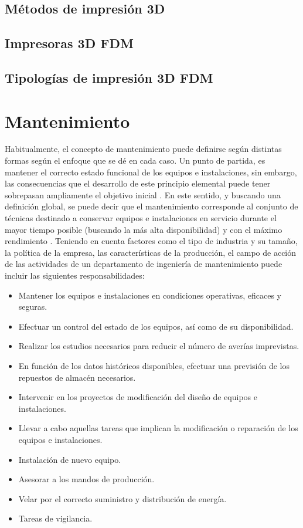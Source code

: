\subsection{Métodos de impresión 3D}

\subsection{Impresoras 3D FDM}

\subsection{Tipologías de impresión 3D FDM}

\section{Mantenimiento}

Habitualmente, el concepto de mantenimiento puede definirse según distintas formas según el enfoque que se dé en cada caso. Un punto de partida, es mantener el correcto estado funcional de los equipos e instalaciones, sin embargo, las consecuencias que el desarrollo de este principio elemental puede tener sobrepasan ampliamente el objetivo inicial \citep{gomez1998}. En este sentido, y buscando una definición global, se puede decir que el mantenimiento corresponde al conjunto de técnicas destinado a conservar equipos e instalaciones en servicio durante el mayor tiempo posible (buscando la más alta disponibilidad) y con el máximo rendimiento \citep{garcia2010}.
Teniendo en cuenta factores como el tipo de industria y su tamaño, la política de la empresa, las características de la producción, el campo de acción de las actividades de un departamento de ingeniería de mantenimiento puede incluir las siguientes responsabilidades\citep{gomez1998}: \\

\begin{itemize}
\item Mantener los equipos e instalaciones en condiciones operativas, eficaces y seguras.
\item Efectuar un control del estado de los equipos, así como de su disponibilidad.
\item Realizar los estudios necesarios para reducir el número de averías imprevistas.
\item En función de los datos históricos disponibles, efectuar una previsión de los repuestos de almacén necesarios.
\item Intervenir en los proyectos de modificación del diseño de equipos e instalaciones.
\item Llevar a cabo aquellas tareas que implican la modificación o reparación de los equipos e instalaciones.
\item Instalación de nuevo equipo.
\item Asesorar a los mandos de producción.
\item Velar por el correcto suministro y distribución de energía.
\item Tareas de vigilancia.
\end{itemize}

